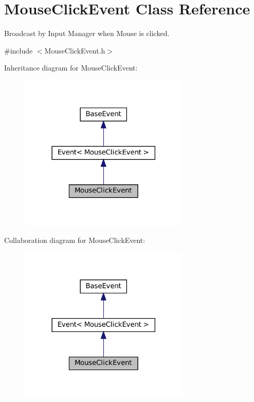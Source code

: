 \hypertarget{classMouseClickEvent}{}\section{Mouse\+Click\+Event Class Reference}
\label{classMouseClickEvent}


Broadcast by Input Manager when Mouse is clicked.  




{\ttfamily \#include $<$Mouse\+Click\+Event.\+h$>$}



Inheritance diagram for Mouse\+Click\+Event\+:\nopagebreak
\begin{figure}[H]
\begin{center}
\leavevmode
\includegraphics[width=230pt]{classMouseClickEvent__inherit__graph}
\end{center}
\end{figure}


Collaboration diagram for Mouse\+Click\+Event\+:\nopagebreak
\begin{figure}[H]
\begin{center}
\leavevmode
\includegraphics[width=230pt]{classMouseClickEvent__coll__graph}
\end{center}
\end{figure}
